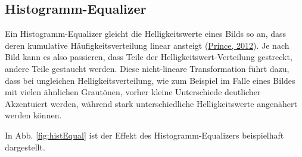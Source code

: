 \documentclass[
  12pt,
]{book}
\begin{document}
\hypertarget{histogramm-equalizer}{%
\subsection{Histogramm-Equalizer}\label{histogramm-equalizer}}

Ein Histogramm-Equalizer gleicht die Helligkeitswerte eines Bilds so an, dass deren kumulative Häufigkeitsverteilung linear ansteigt (\protect\hyperlink{ref-princePartIVPreprocessing2012}{Prince, 2012}). Je nach Bild kann es also passieren, dass Teile der Helligkeitswert-Verteilung gestreckt, andere Teile gestaucht werden.
Diese nicht-lineare Transformation führt dazu, dass bei ungleichen Helligkeitsverteilung, wie zum Beispiel im Falle eines Bildes mit vielen ähnlichen Grautönen, vorher kleine Unterschiede deutlicher Akzentuiert werden, während stark unterschiedliche Helligkeitswerte angenähert werden können.

In Abb. \ref{fig:histEqual} ist der Effekt des Histogramm-Equalizers beispielhaft dargestellt.
\end{document}
